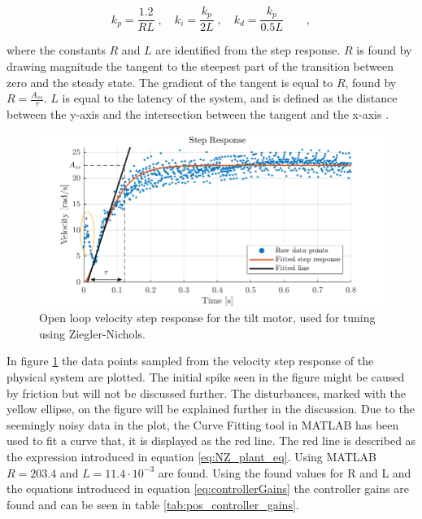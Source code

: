 \documentclass[../../main.tex]{subfiles}
\begin{document}
\begin{equation}
k_p = \frac{1.2}{RL}\;, \quad k_i = \frac{k_p}{2L}\;, \quad k_d = \frac{k_p}{0.5L} \qquad ,
\label{eq:controllerGains}
\end{equation}

where the constants $R$ and $L$ are identified from the step response. $R$ is found by drawing magnitude the tangent to the steepest part of the transition between zero and the steady state. The gradient of the tangent is equal to $R$, found by $R = \frac{A_{ss}}{\tau}$. $L$ is equal to the latency of the system, and is defined as the distance between the y-axis and the intersection between the tangent and the x-axis \cite{}. 



\begin{figure}
    \centering
    \includegraphics[width = 1\textwidth]{Sections/System_Design/Images/Ziegler-Nichols_Stepresponse_anno.png}
    \caption{Open loop velocity step response for the tilt motor, used for tuning using Ziegler-Nichols.}
    \label{fig:stepPlantNZ}
\end{figure}

In figure \ref{fig:stepPlantNZ} the data points sampled from the velocity step response of the physical system are plotted. The initial spike seen in the figure might be caused by friction but will not be discussed further. The disturbances, marked with the yellow ellipse, on the figure will be explained further in the discussion. Due to the seemingly noisy data in the plot, the Curve Fitting tool in MATLAB has been used to fit a curve that, it is displayed as the red line. The red line is described as the expression introduced in equation \ref{eq:NZ_plant_eq}. Using MATLAB $R = 203.4 $ and $L = 11.4 \cdot 10^{-3}$ are found. Using the found values for R and L and the equations introduced in equation \ref{eq:controllerGains} the controller gains are found and can be seen in table \ref{tab:pos_controller_gains}.
\end{document}
